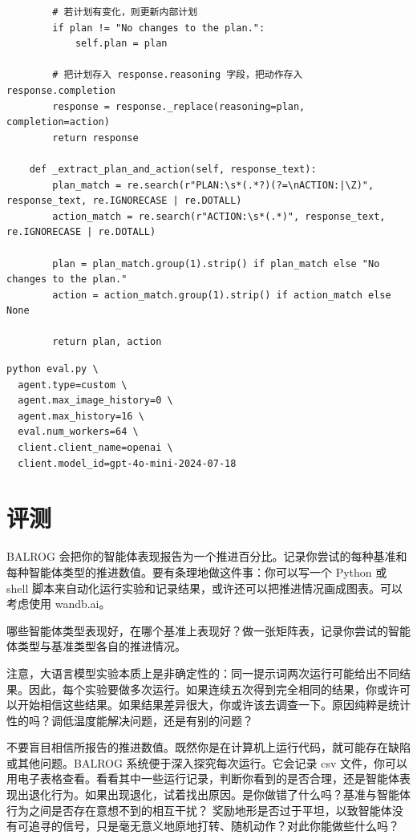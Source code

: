 \begin{listing}
\begin{verbatim}
        # 若计划有变化，则更新内部计划
        if plan != "No changes to the plan.":
            self.plan = plan

        # 把计划存入 response.reasoning 字段，把动作存入 response.completion
        response = response._replace(reasoning=plan, completion=action)
        return response

    def _extract_plan_and_action(self, response_text):
        plan_match = re.search(r"PLAN:\s*(.*?)(?=\nACTION:|\Z)", response_text, re.IGNORECASE | re.DOTALL)
        action_match = re.search(r"ACTION:\s*(.*)", response_text, re.IGNORECASE | re.DOTALL)

        plan = plan_match.group(1).strip() if plan_match else "No changes to the plan."
        action = action_match.group(1).strip() if action_match else None

        return plan, action
\end{verbatim}
    \caption{BALROG 中的智能体代码}\label{lst:agent}
\end{listing}

\begin{listing}
    \begin{verbatim}
python eval.py \
  agent.type=custom \
  agent.max_image_history=0 \
  agent.max_history=16 \
  eval.num_workers=64 \
  client.client_name=openai \
  client.model_id=gpt-4o-mini-2024-07-18        
    \end{verbatim}
    \caption{运行智能体评测}\label{lst:agent-run}
\end{listing}

\section{评测}
BALROG 会把你的智能体表现报告为一个推进百分比。记录你尝试的每种基准和每种智能体类型的推进数值。要有条理地做这件事：你可以写一个 Python 或 shell 脚本来自动化运行实验和记录结果，或许还可以把推进情况画成图表。可以考虑使用 wandb.ai。

哪些智能体类型表现好，在哪个基准上表现好？做一张矩阵表，记录你尝试的智能体类型与基准类型各自的推进情况。

注意，大语言模型实验本质上是非确定性的：同一提示词两次运行可能给出不同结果。因此，每个实验要做多次运行。如果连续五次得到完全相同的结果，你或许可以开始相信这些结果。如果结果差异很大，你或许该去调查一下。原因纯粹是统计性的吗？调低温度能解决问题，还是有别的问题？

不要盲目相信所报告的推进数值。既然你是在计算机上运行代码，就可能存在缺陷或其他问题。BALROG 系统便于深入探究每次运行。它会记录 csv 文件，你可以用电子表格查看。看看其中一些运行记录，判断你看到的是否合理，还是智能体表现出退化行为。如果出现退化，试着找出原因。是你做错了什么吗？基准与智能体行为之间是否存在意想不到的相互干扰？
奖励地形是否过于平坦，以致智能体没有可追寻的信号，只是毫无意义地原地打转、随机动作？对此你能做些什么吗？

